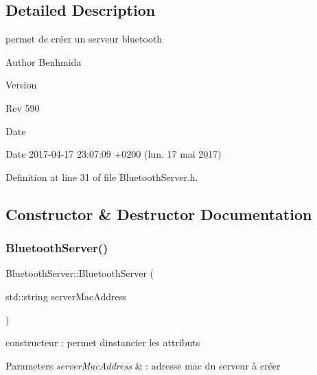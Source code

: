 \subsection{Detailed Description}
permet de créer un serveur bluetooth 

\begin{DoxyAuthor}{Author}
Benhmida 
\end{DoxyAuthor}
\begin{DoxyVersion}{Version}

\end{DoxyVersion}
\begin{DoxyParagraph}{Rev}
590 
\end{DoxyParagraph}
\begin{DoxyDate}{Date}

\end{DoxyDate}
\begin{DoxyParagraph}{Date}
2017-\/04-\/17 23\+:07\+:09 +0200 (lun. 17 mai 2017) 
\end{DoxyParagraph}


Definition at line 31 of file Bluetooth\+Server.\+h.



\subsection{Constructor \& Destructor Documentation}
\mbox{\label{class_bluetooth_server_a8a33f843cb11c3d8bd1a1613bceeb963}} 
\subsubsection{\texorpdfstring{Bluetooth\+Server()}{BluetoothServer()}}
{\footnotesize\ttfamily Bluetooth\+Server\+::\+Bluetooth\+Server (\begin{DoxyParamCaption}\item[{std\+::string}]{server\+Mac\+Address }\end{DoxyParamCaption})}



constructeur \+: permet d\textquotesingle{}instancier les attributs 


\begin{DoxyParams}{Parameters}
{\em server\+Mac\+Address} & \+: adresse mac du serveur à créer \\
\hline
\end{DoxyParams}



